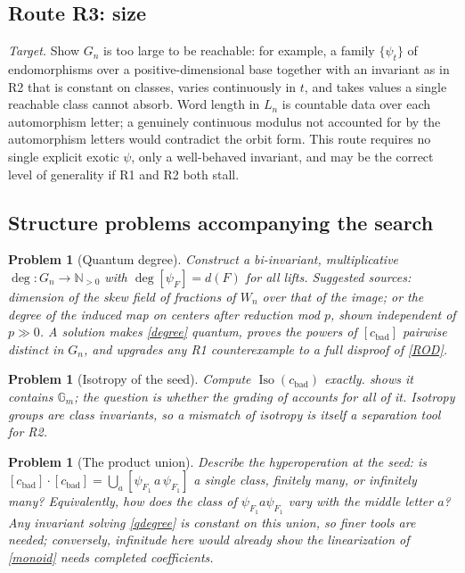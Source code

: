 \documentclass[11pt]{article}
\theoremstyle{change}
\newtheorem{problem}[equation]{Problem}
\theoremstyle{nonumberplain}
\numberwithin{equation}{section}
\newcommand\NN{{\mathbb N}}
\newcommand\setof[1]{\{ #1 \}}
\DeclareMathOperator{\Iso}{Iso}
\begin{document}
\subsection{Route R3: size}

\emph{Target.} Show $G_n$ is too large to be reachable: for example, a family $\setof{\psi_t}$ of endomorphisms over a positive-dimensional base together with an invariant as in R2 that is constant on classes, varies continuously in $t$, and takes values a single reachable class cannot absorb. Word length in $L_n$ is countable data over each automorphism letter; a genuinely continuous modulus not accounted for by the automorphism letters would contradict the orbit form. This route requires no single explicit exotic $\psi$, only a well-behaved invariant, and may be the correct level of generality if R1 and R2 both stall.

\subsection{Structure problems accompanying the search}

\begin{problem}[Quantum degree\label{qdegree}]
Construct a bi-invariant, multiplicative $\deg: G_n \to \NN_{>0}$ with $\deg[\psi_F] = d(F)$ for all lifts. Suggested sources: dimension of the skew field of fractions of $W_n$ over that of the image; or the degree of the induced map on centers after reduction mod $p$, shown independent of $p \gg 0$. A solution makes \cref{degree} quantum, proves the powers of $[c_{\text{bad}}]$ pairwise distinct in $G_n$, and upgrades any R1 counterexample to a full disproof of \cref{ROD}.
\end{problem}

\begin{problem}[Isotropy of the seed\label{isoproblem}]
Compute $\Iso(c_{\text{bad}})$ exactly.  shows it contains $\mathbb{G}_m$; the question is whether the grading of \cite{Speyer} accounts for all of it. Isotropy groups are class invariants, so a mismatch of isotropy is itself a separation tool for R2.
\end{problem}

\begin{problem}[The product union\label{unionproblem}]
Describe the hyperoperation at the seed: is $[c_{\text{bad}}] \cdot [c_{\text{bad}}] = \bigcup_a [\psi_{F_1} \, a \, \psi_{F_1}]$ a single class, finitely many, or infinitely many? Equivalently, how does the class of $\psi_{F_1} a \psi_{F_1}$ vary with the middle letter $a$? Any invariant solving \cref{qdegree} is constant on this union, so finer tools are needed; conversely, infinitude here would already show the linearization of \cref{monoid} needs completed coefficients.
\end{problem}
\end{document}
